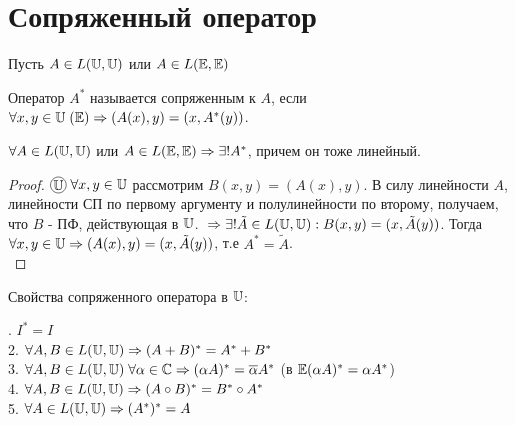 \documentclass[../main.tex]{subfiles}
\begin{document}
\section{Сопряженный оператор}
Пусть $A \in L(\mathbb{U},\mathbb{U})$ или $A \in L(\mathbb{E},\mathbb{E})$
\begin{definition}
    Оператор $A^{*}$ называется сопряженным к $A$, если $\forall x,y \in \mathbb{U} \; (\mathbb{E}) \Rightarrow (A(x),y) = (x,A^{*}(y))$.
\end{definition}
\begin{theorem}
    $\forall A \in L(\mathbb{U},\mathbb{U})$ или $A \in L(\mathbb{E},\mathbb{E}) \Rightarrow \exists ! A^{*}$, причем он тоже линейный. 
\end{theorem}
\begin{proof}
    $\tcircle{$\U$}$\; $\forall x,y \in \mathbb{U} $ рассмотрим $B(x,y) = (A(x),y)$. В силу линейности $A$, линейности СП по первому аргументу и полулинейности по второму, получаем, что $B$ - ПФ, действующая в $\mathbb{U}$. $\\\Rightarrow \exists ! \tilde{A} \in L(\mathbb{U},\mathbb{U}): B(x,y) = (x,\tilde{A}(y))$. Тогда $\forall x,y \in \mathbb{U} \Rightarrow (A(x),y) = (x,\tilde{A}(y))$, т.е $A^{ *} = \tilde{A}$.\\
\end{proof}
Свойства сопряженного оператора в $\mathbb{U}$: 

. $I^{*} = I$ \\ 
2. $\forall A,B \in L(\mathbb{U},\mathbb{U}) \Rightarrow (A+B)^{*}= A^{*}+B^{*}$ \\
3. $\forall A, B \in L(\mathbb{U},\mathbb{U}) \; \forall \alpha \in \mathbb{C} \Rightarrow (\alpha A)^{*} = \overline{\alpha}A^{*}$ \; (в $\mathbb{E} (\alpha A)^{*} = \alpha A^{*}$) \\
4. $\forall A,B \in L(\mathbb{U},\mathbb{U}) \Rightarrow (A\circ B)^{*} = B^{*} \circ A^{*}$ \\
5. $\forall A \in L(\mathbb{U},\mathbb{U}) \Rightarrow (A^{*})^{*} = A$ 
\end{document}
